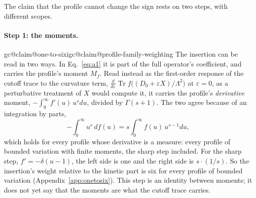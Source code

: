 \documentclass[aps,prd,reprint,amsmath,amssymb,superscriptaddress,nofootinbib]{revtex4-2}
\makeatletter
\newcommand{\claim}[1]{\expandafter\xdef\csname igc@claim@#1\endcsname{\thesection}}
\makeatother
\begin{document}
\begin{table}
\caption{Each species' statistics sign $\sigma$, field components $N$, curvature trace
$c$ and weight, with its coefficient in a horizon's entanglement entropy and its
contact term with the horizon (Sec.~\ref{sec:horizon}), both in units of one minimally
coupled real scalar. The entanglement coefficient is not a count of physical degrees
of freedom: a Weyl fermion has two, which count half each, as fermions do. The
contact term is Kabat's~\cite{Kabat1995}.}
\label{tab:species}
\centering

\end{table}

The claim that the profile cannot change the sign rests on two steps, with different
scopes.

\paragraph{Step 1: the moments.}
\claim{one-to-six}\claim{profile-family-weighting}%
The insertion can be read in two ways. In Eq.~\eqref{eq:a1} it is part of the full
operator's coefficient, and carries the profile's moment $M_f$. Read instead as the
first-order response of the cutoff trace to the curvature term,
$\frac{d}{d\varepsilon}\operatorname{Tr}f\bigl((D_0+\varepsilon X)/\Lambda^2\bigr)$ at
$\varepsilon=0$, as a perturbative treatment of $X$ would compute it, it carries the
profile's \emph{derivative} moment, $-\int_0^\infty f'(u)\,u^{s}du$, divided by
$\Gamma(s+1)$. The two agree because of an integration by parts,
\begin{equation}
-\int_0^\infty u^{s}\,df(u)=s\int_0^\infty f(u)\,u^{s-1}du ,
\label{eq:parts}
\end{equation}
which holds for every profile whose derivative is a measure: every profile of
bounded variation with finite moments, the sharp step included. For the sharp step,
$f'=-\delta(u-1)$, the left side is one and the right side is $s\cdot(1/s)$. So the
insertion's weight relative to the kinetic part is six for every profile of bounded
variation (Appendix~\ref{app:onetosix}). This step is an identity between moments; it
does not yet say that the moments are what the cutoff trace carries.
\end{document}
